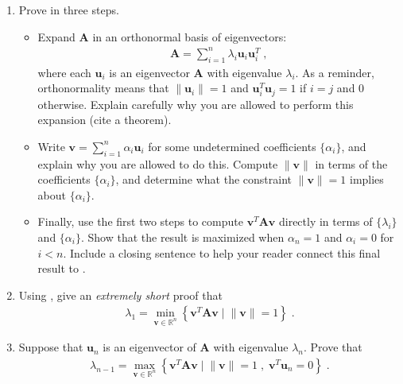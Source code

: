 \documentclass[11pt]{article}
\begin{document}
\begin{tcolorbox}[title = 4. Eigenpairs of symmetric matrices and optimization]
\begin{enumerate}
    \item 
    Prove  in three steps. 
    \begin{itemize}
        \item Expand $\mathbf{A}$ in an orthonormal basis of eigenvectors: 
        \begin{align*}
            \mathbf{A} = \sum_{i = 1}^n \lambda_i\mathbf{u}_i\mathbf{u}_i^T\;,
        \end{align*}
        where each $\mathbf{u}_i$ is an eigenvector $\mathbf{A}$ with eigenvalue $\lambda_i$. 
        As a reminder, orthonormality means that $\lVert \mathbf{u}_i \rVert = 1$ and $\mathbf{u}_i^T \mathbf{u}_j = 1$ if $i = j$ and $0$ otherwise.   
        Explain carefully why you are allowed to perform this expansion (cite a theorem). 
        \item Write $\mathbf{v} = \sum_{i = 1}^n \alpha_i \mathbf{u}_i$ for some undetermined coefficients $\{\alpha_i\}$, and explain why you are allowed to do this. 
        Compute $\lVert \mathbf{v}\rVert$ in terms of the coefficients $\{\alpha_i\}$, and determine what the constraint $\lVert \mathbf{v} \rVert = 1$ implies about $\{\alpha_i\}$. 
        \item Finally, use the first two steps to compute $\mathbf{v}^T\mathbf{A}\mathbf{v}$ directly in terms of $\{\lambda_i\}$ and $\{\alpha_i\}$. 
        Show that the result is maximized when $\alpha_n = 1$ and $\alpha_i = 0$ for $i < n$. 
        Include a closing sentence to help your reader connect this final result to . 
    \end{itemize}
    
    \item 
    Using , give an \emph{extremely short} proof that
    \begin{align*}
        \lambda_1 = \min_{\mathbf{v} \in \mathbb{R}^n} \left\{\mathbf{v}^T\mathbf{A}\mathbf{v} \;\big|\; \lVert{\mathbf{v}}\rVert = 1\right\} \;.
    \end{align*} 

    \item 
    Suppose that $\mathbf{u}_n$ is an eigenvector of $\mathbf{A}$ with eigenvalue $\lambda_n$. 
    Prove that 
    \begin{align*}
        \lambda_{n-1} = \max_{\mathbf{v} \in \mathbb{R}^n} \left\{\mathbf{v}^T\mathbf{A}\mathbf{v} \;\big|\; \lVert{\mathbf{v}}\rVert = 1\;, \; \mathbf{v}^T\mathbf{u}_n = 0\right\}\;. 
    \end{align*}
\end{enumerate}
\end{tcolorbox}
\end{document}

